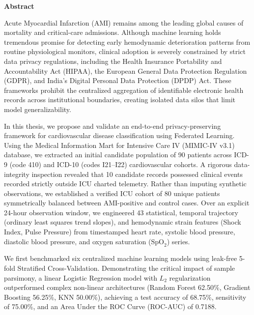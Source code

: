\documentclass[12pt,a4paper,oneside]{report}
\begin{document}
\cleardoublepage
{}
{}
\begin{center}
    {\Large \textbf{Abstract}\par}
    \vspace{0.4in}
\end{center}

Acute Myocardial Infarction (AMI) remains among the leading global causes of mortality and critical-care admissions. Although machine learning holds tremendous promise for detecting early hemodynamic deterioration patterns from routine physiological monitors, clinical adoption is severely constrained by strict data privacy regulations, including the Health Insurance Portability and Accountability Act (HIPAA), the European General Data Protection Regulation (GDPR), and India's Digital Personal Data Protection (DPDP) Act. These frameworks prohibit the centralized aggregation of identifiable electronic health records across institutional boundaries, creating isolated data silos that limit model generalizability.

In this thesis, we propose and validate an end-to-end privacy-preserving framework for cardiovascular disease classification using Federated Learning. Using the Medical Information Mart for Intensive Care IV (MIMIC-IV v3.1) database, we extracted an initial candidate population of 90 patients across ICD-9 (code 410) and ICD-10 (codes I21--I22) cardiovascular cohorts. A rigorous data-integrity inspection revealed that 10 candidate records possessed clinical events recorded strictly outside ICU charted telemetry. Rather than imputing synthetic observations, we established a verified ICU cohort of 80 unique patients symmetrically balanced between AMI-positive and control cases. Over an explicit 24-hour observation window, we engineered 43 statistical, temporal trajectory (ordinary least squares trend slopes), and hemodynamic strain features (Shock Index, Pulse Pressure) from timestamped heart rate, systolic blood pressure, diastolic blood pressure, and oxygen saturation ($\text{SpO}_2$) series.

We first benchmarked six centralized machine learning models using leak-free 5-fold Stratified Cross-Validation. Demonstrating the critical impact of sample parsimony, a linear Logistic Regression model with $L_2$ regularization outperformed complex non-linear architectures (Random Forest 62.50\%, Gradient Boosting 56.25\%, KNN 50.00\%), achieving a test accuracy of 68.75\%, sensitivity of 75.00\%, and an Area Under the ROC Curve (ROC-AUC) of 0.7188.
\end{document}
